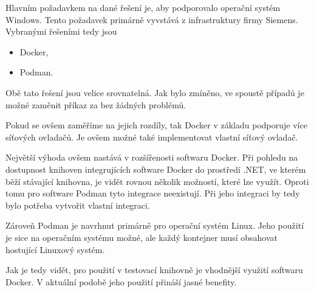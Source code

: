 Hlavním požadavkem na dané řešení je, aby podporovalo operační systém Windows. Tento požadavek primárně vyvstává z infrastruktury firmy Siemens. Vybranými řešeními tedy jsou

\begin{itemize}
    \item Docker,
    \item Podman.
\end{itemize}

Obě tato řešení jsou velice srovnatelná. Jak bylo zmíněno, ve spoustě případů je možné zaměnit příkaz  za  bez žádných problémů. 

Pokud se ovšem zaměříme na jejich rozdíly, tak Docker v základu podporuje více síťových ovladačů. Je ovšem možné také implementovat vlastní síťový ovladač. \cite{docker_networking_overview}

Největší výhoda ovšem nastává v rozšířenosti softwaru Docker. Při pohledu na dostupnost knihoven integrujících software Docker do prostředí .NET, ve kterém běží stávající knihovna, je vidět rovnou několik možností, které lze využít. Oproti tomu pro software Podman tyto integrace neexistují. Při jeho integraci by tedy bylo potřeba vytvořit vlastní integraci. 

Zároveň Podman je navrhnut primárně pro operační systém Linux. Jeho použití je sice na operačním systému možné, ale každý kontejner musí obsahovat hostující Linuxový systém. 

Jak je tedy vidět, pro použití v testovací knihovně je vhodnější využití softwaru Docker. V aktuální podobě jeho použití přináší jasné benefity. 